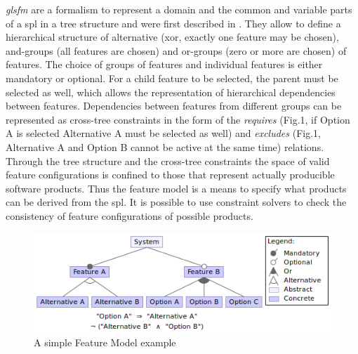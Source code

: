 \textit{gls{fm}} are a formalism to represent a domain and the common and variable parts of a \Gls{spl} in a tree structure and were first described in \cite{Kang1990}. They allow to define a hierarchical structure of alternative (xor, exactly one feature may be chosen), and-groups (all features are chosen) and or-groups (zero or more are chosen) of features. The choice of groups of features and individual features is either mandatory or optional. For a child feature to be selected, the parent must be selected as well, which allows the representation of hierarchical dependencies between features. Dependencies between features from different groups can be represented as cross-tree constraints in the form of the \textit{requires} (Fig.1, if Option A is selected Alternative A must be selected as well) and \textit{excludes} (Fig.1, Alternative A and Option B cannot be active at the same time) relations. Through the tree structure and the cross-tree constraints the space of valid feature configurations is confined to those that represent actually producible software products. Thus the feature model is a means to specify what products can be derived from the \gls{spl}.
It is possible to use constraint solvers to check the consistency of feature configurations of possible products.
\begin{figure}
\centering
\caption{A simple Feature Model example}
\includegraphics[scale=1]{FMexample.png}
\end{figure}



